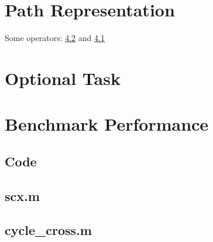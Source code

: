 \documentclass{article}
\begin{document}
\section{Path Representation}

Some operators: \ref{code:cycle_cross} and \ref{code:scx}

\section{Optional Task}

\section{Benchmark Performance}

\newpage
{}
\begin{appendices}
\section{Code}
\subsection{scx.m}\label{code:scx}
	
\subsection{cycle\_cross.m}\label{code:cycle_cross}
	
\end{appendices}
\restoregeometry
\end{document}
